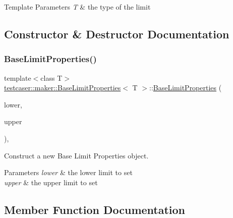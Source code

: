 \begin{DoxyTemplParams}{Template Parameters}
{\em T} & the type of the limit \\
\hline
\end{DoxyTemplParams}


\subsection{Constructor \& Destructor Documentation}
\mbox{\label{classtestcaser_1_1maker_1_1BaseLimitProperties_a1022e529219cf4e212055bdbb25c4027}} 
\subsubsection{\texorpdfstring{BaseLimitProperties()}{BaseLimitProperties()}}
{\footnotesize\ttfamily template$<$class T$>$ \\
\mbox{\hyperlink{classtestcaser_1_1maker_1_1BaseLimitProperties}{testcaser\+::maker\+::\+Base\+Limit\+Properties}}$<$ T $>$\+::\mbox{\hyperlink{classtestcaser_1_1maker_1_1BaseLimitProperties}{Base\+Limit\+Properties}} (\begin{DoxyParamCaption}\item[{T}]{lower,  }\item[{T}]{upper }\end{DoxyParamCaption})\hspace{0.3cm}{\ttfamily [inline]}, {\ttfamily [explicit]}}



Construct a new Base Limit Properties object. 


\begin{DoxyParams}{Parameters}
{\em lower} & the lower limit to set \\
\hline
{\em upper} & the upper limit to set \\
\hline
\end{DoxyParams}


\subsection{Member Function Documentation}
\mbox{\label{classtestcaser_1_1maker_1_1BaseLimitProperties_a1b8a120b2230476fc4fc97d4720fd3e5}} 
